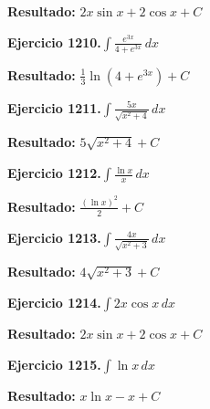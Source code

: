 \documentclass[10pt,a4paper]{article}
\begin{document}
\begin{solbox}
\textbf{Resultado:} \(\displaystyle 2x\sin x + 2\cos x + C\)
\end{solbox}

\newpage
\begin{ejbox}
\textbf{Ejercicio 1210.}\quad $\int \frac{e^{3x}}{4+e^{3x}}\,dx$
\end{ejbox}

\begin{solbox}
\textbf{Resultado:} \(\displaystyle \frac{1}{3}\ln(4+e^{3x}) + C\)
\end{solbox}

\begin{ejbox}
\textbf{Ejercicio 1211.}\quad $\int \frac{5x}{\sqrt{x^2+4}}\,dx$
\end{ejbox}

\begin{solbox}
\textbf{Resultado:} \(\displaystyle 5\sqrt{x^2+4} + C\)
\end{solbox}

\begin{ejbox}
\textbf{Ejercicio 1212.}\quad $\int \frac{\ln x}{x}\,dx$
\end{ejbox}

\begin{solbox}
\textbf{Resultado:} \(\displaystyle \frac{(\ln x)^2}{2} + C\)
\end{solbox}

\newpage
\begin{ejbox}
\textbf{Ejercicio 1213.}\quad $\int \frac{4x}{\sqrt{x^2+3}}\,dx$
\end{ejbox}

\begin{solbox}
\textbf{Resultado:} \(\displaystyle 4\sqrt{x^2+3} + C\)
\end{solbox}

\begin{ejbox}
\textbf{Ejercicio 1214.}\quad $\int 2x \cos x\,dx$
\end{ejbox}

\begin{solbox}
\textbf{Resultado:} \(\displaystyle 2x\sin x + 2\cos x + C\)
\end{solbox}

\begin{ejbox}
\textbf{Ejercicio 1215.}\quad $\int \ln x\,dx$
\end{ejbox}

\begin{solbox}
\textbf{Resultado:} \(\displaystyle x\ln x - x + C\)
\end{solbox}
\end{document}
